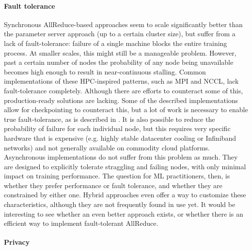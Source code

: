 \paragraph{Fault tolerance}

Synchronous AllReduce-based approaches seem to scale significantly better than the parameter server approach (up to a certain cluster size), but suffer from a lack of fault-tolerance: failure of a single machine blocks the entire training process. At smaller scales, this might still be a manageable problem. However, past a certain number of nodes the probability of any node being unavailable becomes high enough to result in near-continuous stalling. Common implementations of these HPC-inspired patterns, such as MPI and NCCL, lack fault-tolerance completely. Although there are efforts to counteract some of this, production-ready solutions are lacking. Some of the described implementations allow for checkpointing to counteract this, but a lot of work is necessary to enable true fault-tolerance, as is described in \citet{Amatya2017}. It is also possible to reduce the probability of failure for each individual node, but this requires very specific hardware that is expensive (e.g. highly stable datacenter cooling or Infiniband networks) and not generally available on commodity cloud platforms.
Asynchronous implementations do not suffer from this problem as much. They are designed to explicitly tolerate straggling and failing nodes, with only minimal impact on training performance. The question for ML practitioners, then, is whether they prefer performance or fault tolerance, and whether they are constrained by either one. Hybrid approaches even offer a way to customize these characteristics, although they are not frequently found in use yet. It would be interesting to see whether an even better approach exists, or whether there is an efficient way to implement fault-tolerant AllReduce.

\paragraph{Privacy}

